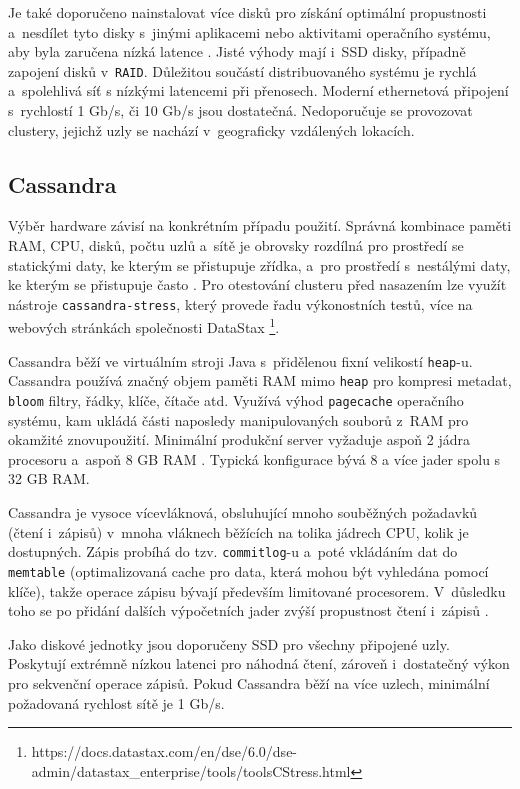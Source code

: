 Je také doporučeno nainstalovat více disků pro získání optimální propustnosti a~nesdílet tyto disky s~jinými aplikacemi nebo aktivitami operačního systému, aby byla zaručena nízká latence \cite{kafkaBestPractises}. Jisté výhody mají i~SSD disky, případně zapojení disků v~\texttt{RAID}. Důležitou součástí distribuovaného systému je rychlá a~spolehlivá síť s nízkými latencemi při přenosech. Moderní ethernetová připojení s~rychlostí 1 Gb/s, či 10 Gb/s jsou dostatečná. Nedoporučuje se provozovat clustery, jejichž uzly se nachází v~geograficky vzdálených lokacích.

\subsection{Cassandra}
Výběr hardware závisí na konkrétním případu použití. Správná kombinace paměti RAM, CPU, disků, počtu uzlů a~sítě je obrovsky rozdílná pro prostředí se statickými daty, ke kterým se přistupuje zřídka, a~pro prostředí s~nestálými daty, ke kterým se přistupuje často \cite{cassandraPlanningHW}. Pro otestování clusteru před nasazením lze využít nástroje \texttt{cassandra-stress}, který provede řadu výkonostních testů, více na webových stránkách společnosti DataStax \footnote{https://docs.datastax.com/en/dse/6.0/dse-admin/datastax\_enterprise/tools/toolsCStress.html}.

Cassandra běží ve virtuálním stroji Java s~přidělenou fixní velikostí \texttt{heap}-u. Cassandra používá značný objem paměti RAM mimo \texttt{heap} pro kompresi metadat, \texttt{bloom} filtry, řádky, klíče, čítače atd. Využívá výhod \texttt{pagecache} operačního systému, kam ukládá části naposledy manipulovaných souborů z~RAM pro okamžité znovupoužití. 
Minimální produkční server vyžaduje aspoň 2 jádra procesoru a~aspoň 8 GB RAM \cite{cassandraHW}. Typická konfigurace bývá 8 a více jader spolu s 32 GB RAM.

Cassandra je vysoce vícevláknová, obsluhující mnoho souběžných požadavků (čtení i~zápisů) v~mnoha vláknech běžících na tolika jádrech CPU, kolik je dostupných. Zápis probíhá do tzv. \texttt{commitlog}-u a~poté vkládáním dat do \texttt{memtable} (optimalizovaná cache pro data, která mohou být vyhledána pomocí klíče), takže operace zápisu bývají především limitované procesorem. V~důsledku toho se po přidání dalších výpočetních jader zvýší propustnost čtení i~zápisů \cite{cassandraHW}.

Jako diskové jednotky jsou doporučeny SSD pro všechny připojené uzly. Poskytují extrémně nízkou latenci pro náhodná čtení, zároveň i~dostatečný výkon pro sekvenční operace zápisů. Pokud Cassandra běží na více uzlech, minimální požadovaná rychlost sítě je 1 Gb/s.

